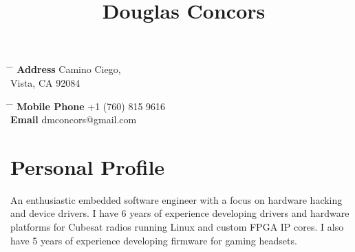 \documentclass[10pt]{article} %
\begin{document}

\begin{center}
\title{Douglas Concors} %
\end{center}


\parbox{0.5\textwidth}{ %
\begin{tabbing} %
\hspace{3cm} \= \hspace{4cm} \= \kill %
{\bf Address}  Camino Ciego,\\ %
\> Vista, CA 92084 \\ %
\end{tabbing}}
\hfill %
\parbox{0.5\textwidth}{ %
\begin{tabbing} %
\hspace{3cm} \= \hspace{4cm} \= \kill %
{\bf Mobile Phone} \> +1 (760) 815 9616 \\ %
{\bf Email} \> dmconcors@gmail.com \\ %
\end{tabbing}}


\section{Personal Profile}

An enthusiastic embedded software engineer with a focus on hardware hacking and device drivers. I have 6 years of experience developing drivers and hardware platforms for Cubesat radios running Linux and custom FPGA IP cores. I also have 5 years of experience developing firmware for gaming headsets.
\end{document}

